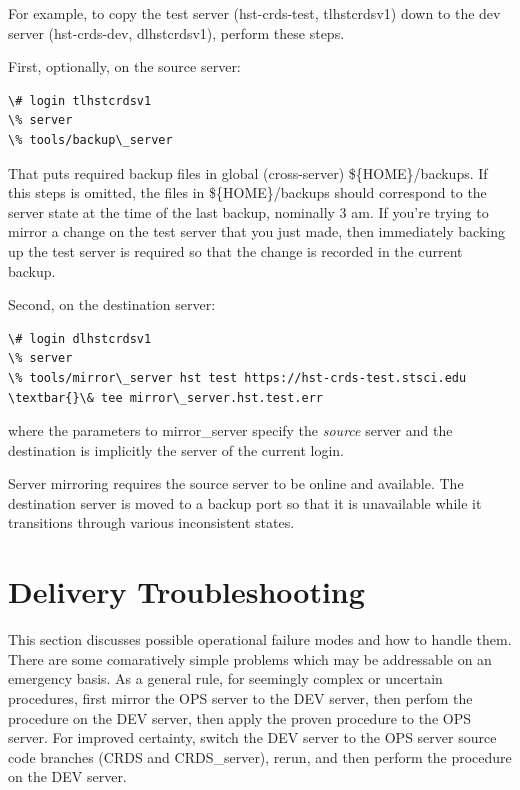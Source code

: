 \documentclass[letterpaper,10pt,english]{sphinxmanual}
\begin{document}
For example,  to copy the test server (hst-crds-test, tlhstcrdsv1) down to the dev server (hst-crds-dev, dlhstcrdsv1),
perform these steps.

First, optionally, on the source server:

\begin{Verbatim}[commandchars=\\\{\}]
\# login tlhstcrdsv1
\% server
\% tools/backup\_server
\end{Verbatim}

That puts required backup files in global (cross-server) \$\{HOME\}/backups.  If this steps is omitted,  the files in
\$\{HOME\}/backups should correspond to the server state at the time of the last backup,  nominally 3 am.  If you're trying
to mirror a change on the test server that you just made,  then immediately backing up the test server is required so
that the change is recorded in the current backup.

Second, on the destination server:

\begin{Verbatim}[commandchars=\\\{\}]
\# login dlhstcrdsv1
\% server
\% tools/mirror\_server hst test https://hst-crds-test.stsci.edu \textbar{}\& tee mirror\_server.hst.test.err
\end{Verbatim}

where the parameters to mirror\_server specify the \emph{source} server and the destination is implicitly the
server of the current login.

Server mirroring requires the source server to be online and available.   The destination server is moved
to a backup port so that it is unavailable while it transitions through various inconsistent states.


\chapter{Delivery Troubleshooting}
\label{server_guide:delivery-troubleshooting}
This section discusses possible operational failure modes and how to handle them.   There are some comaratively simple
problems which may be addressable on an emergency basis.   As a general rule,  for seemingly complex or uncertain
procedures,  first mirror the OPS server to the DEV server,  then perfom the procedure on the DEV server,  then
apply the proven procedure to the OPS server.   For improved certainty,  switch the DEV server to the OPS server
source code branches (CRDS and CRDS\_server),  rerun,  and then perform the procedure on the DEV server.
\end{document}
